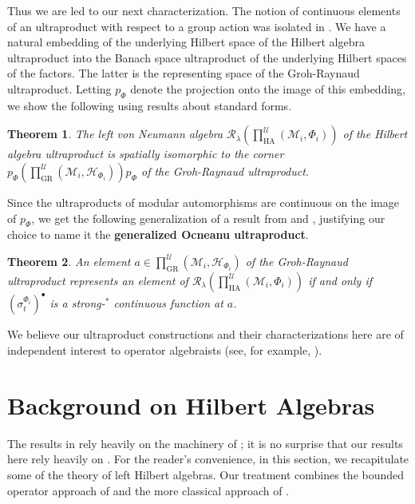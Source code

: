 \documentclass[12pt]{amsart}
\newtheorem*{thm*}{Theorem}
\theoremstyle{definition}
\def\cal{\mathcal}
\newcommand\cU{{\cal U}}
\newcommand\R{{\cal R}}
\def \GR{\operatorname{GR}}
\def \HA{\operatorname{HA}}
\begin{document}
Thus we are led to our next characterization.  The notion of continuous elements of an ultraproduct with respect to a group action was isolated in \cite{BYG}.  We have a natural embedding of the underlying Hilbert space of the Hilbert algebra ultraproduct into the Banach space ultraproduct of the underlying Hilbert spaces of the factors.  The latter is the representing space of the Groh-Raynaud ultraproduct.  Letting $p_{\Phi}$ denote the projection onto the image of this embedding, we show the following using results about standard forms.

\begin{thm*}
    The left von Neumann algebra $\R_{\lambda}\left( \prod^{\cU}_{\HA} (\cal M_i, \Phi_i) \right)$ of the Hilbert algebra ultraproduct is spatially isomorphic to the corner $p_{\Phi}\left( \prod^{\cU}_{\GR}(\cal M_i, \cal H_{\Phi_i}) \right) p_{\Phi}$ of the Groh-Raynaud ultraproduct.
\end{thm*}

Since the ultraproducts of modular automorphisms are continuous on the image of $p_{\Phi}$, we get the following generalization of a result from \cite{AH} and \cite{MT}, justifying our choice to name it the \textbf{generalized Ocneanu ultraproduct}.

\begin{thm*}
    An element $a \in \prod^{\cU}_{\GR}(\cal M_i, \cal H_{\Phi_i})$ of the Groh-Raynaud ultraproduct represents an element of $\R_{\lambda}\left( \prod^{\cU}_{\HA} (\cal M_i, \Phi_i) \right)$ if and only if $(\sigma^{\Phi_{i}}_{t})^{\bullet}$ is a strong-$^*$ continuous function at $a$.
\end{thm*}

We believe our ultraproduct constructions and their characterizations here are of independent interest to operator algebraists (see, for example, \cite{Cas}).

\section{Background on Hilbert Algebras}\label{SectionHilbertAlg}

The results in \cite{AGHS} rely heavily on the machinery of \cite[Section 4]{RvD}; it is no surprise that our results here rely heavily on \cite[Section 5]{RvD}.  For the reader's convenience, in this section, we recapitulate some of the theory of left Hilbert algebras.  Our treatment combines the bounded operator approach of \cite{RvD} and the more classical approach of \cite[Volume II, Chapter IV]{Takesaki}.
\end{document}
